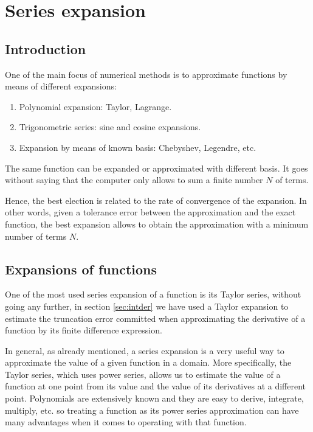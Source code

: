 \chapter{Series expansion} 


\section{Introduction} 

One of the main focus of numerical methods is to approximate functions by means of different expansions: 

\begin{enumerate} 
\setlength\itemsep{-0.1cm}
	\item Polynomial expansion: Taylor, Lagrange.
	\item Trigonometric series: sine and cosine expansions. 
	\item Expansion by means of known basis: Chebyshev, Legendre, etc. 
\end{enumerate} 

The same function can be expanded or approximated with different basis.
It goes without saying that the computer only allows to sum a finite number $ N $  of terms. 

Hence, the best election is related to the rate of convergence 
of the expansion. In other words, given a tolerance error between the approximation and the exact function, 
the best expansion allows to obtain the approximation with a minimum number of terms $N$. 




\newpage
\section{Expansions of functions} 
   
One of the most used series expansion of a function is its Taylor series, without going any further, in section \ref{sec:intder} we have used a Taylor expansion to estimate the truncation error committed when approximating the derivative of a function by its finite difference expression.

In general, as already mentioned, a series expansion is a very useful way to approximate the value of a given function in a domain. More specifically, the Taylor series, which uses power series, allows us to estimate the value of a function at one point from its value and the value of its derivatives at a different point. Polynomials are extensively known and they are easy to derive, integrate, multiply, etc. so treating a function as its power series approximation can have many advantages when it comes to operating with that function.

